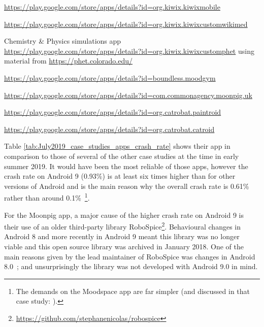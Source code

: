 \begin{table}
\begin{threeparttable}
\begin{tablenotes}
\footnotesize
\item [1]\url{https://play.google.com/store/apps/details?id=org.kiwix.kiwixmobile}
\item [2]\url{https://play.google.com/store/apps/details?id=org.kiwix.kiwixcustomwikimed}
\item [3]Chemistry \& Physics simulations app \url{https://play.google.com/store/apps/details?id=org.kiwix.kiwixcustomphet} using material from \url{https://phet.colorado.edu/}  
\item [4]\url{https://play.google.com/store/apps/details?id=boundless.moodgym}
\item [5]\url{https://play.google.com/store/apps/details?id=com.commonagency.moonpig.uk}
\item [6]\url{https://play.google.com/store/apps/details?id=org.catrobat.paintroid}
\item[7]\url{https://play.google.com/store/apps/details?id=org.catrobat.catroid}
\end{tablenotes}
\end{threeparttable}
\end{table}


Table \ref{tab:July2019_case_studies_apps_crash_rate} shows their app in comparison to those of several of the other case studies at the time in early summer 2019. It would have been the most reliable of those apps, however the crash rate on Android 9 (0.93\%) is at least six times higher than for other versions of Android and is the main reason why the overall crash rate is 0.61\% rather than around 0.1\%~\footnote{The demands on the Moodspace app are far simpler (and discussed in that case study: ). %
}.

For the Moonpig app, a major cause of the higher crash rate on Android 9 is their use of an older third-party library RoboSpice\footnote{\url{https://github.com/stephanenicolas/robospice}}. Behavioural changes in Android 8 and more recently in Android 9 meant this library was no longer viable and this open source library was archived in January 2018. One of the main reasons given by the lead maintainer of RoboSpice was changes in Android 8.0~\citep{Robospice01}; and unsurprisingly the library was not developed with Android 9.0 in mind. 

